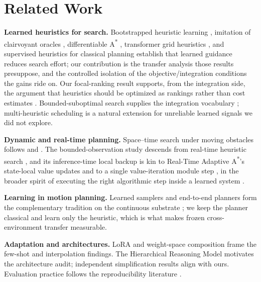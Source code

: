 \documentclass[letterpaper]{article} %
\begin{document}
\section{Related Work}

\textbf{Learned heuristics for search.} Bootstrapped heuristic learning \citep{arfaee2011bootstrap}, imitation of clairvoyant oracles \citep{bhardwaj2017sail}, differentiable A\textsuperscript{*} \citep{yonetani2021neuralastar}, transformer grid heuristics \citep{kirilenko2023transpath}, and supervised heuristics for classical planning \citep{ferber2020neural} establish that learned guidance reduces search effort; our contribution is the transfer analysis those results presuppose, and the controlled isolation of the objective/integration conditions the gains ride on. Our focal-ranking result supports, from the integration side, the argument that heuristics should be optimized as rankings rather than cost estimates \citep{chrestien2023rank}. Bounded-suboptimal search supplies the integration vocabulary \citep{pohl1970,pearl1982semiadmissible}; multi-heuristic scheduling \citep{aine2016mha} is a natural extension for unreliable learned signals we did not explore.

\textbf{Dynamic and real-time planning.} Space--time search under moving obstacles follows \citet{silver2005cooperative} and \citet{phillips2011sipp}. The bounded-observation study descends from real-time heuristic search \citep{korf1990rta}, and its inference-time local backup is kin to Real-Time Adaptive A\textsuperscript{*}'s state-local value updates \citep{koenig2006rtaa} and to a single value-iteration module step \citep{tamar2016vin,lee2018gppn}, in the broader spirit of executing the right algorithmic step inside a learned system \citep{velickovic2021nar}.

\textbf{Learning in motion planning.} Learned samplers and end-to-end planners \citep{ichter2018sampling,qureshi2019mpnet} form the complementary tradition on the continuous substrate \citep{kavraki1996prm}; we keep the planner classical and learn only the heuristic, which is what makes frozen cross-environment transfer measurable.

\textbf{Adaptation and architectures.} LoRA \citep{hu2021lora} and weight-space composition \citep{wortsman2022soups,ilharco2022task} frame the few-shot and interpolation findings. The Hierarchical Reasoning Model \citep{wang2025hrm} motivates the architecture audit; independent simplification results \citep{jolicoeur2025trm} align with ours. Evaluation practice follows the reproducibility literature \citep{henderson2018matters,agarwal2021precipice,pineau2021reproducibility}.
\end{document}
